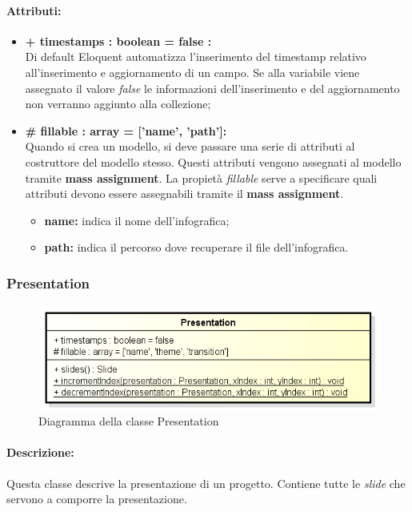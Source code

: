 	\paragraph{Attributi:}
		\begin{itemize}
			\item \textbf{+ timestamps : boolean = false :}\\
			Di default Eloquent automatizza l'inserimento del timestamp relativo all'inserimento e aggiornamento di un campo. Se alla variabile viene assegnato il valore \textit{false} le informazioni dell'inserimento e del aggiornamento non verranno aggiunto alla collezione;
			\item \textbf{\# fillable : array = [’name’, ’path’]:}\\
			Quando si crea un modello, si deve passare una serie di attributi al costruttore del modello stesso. Questi attributi vengono assegnati al modello tramite \textbf{mass assignment}. La propietà \textit{fillable} serve a specificare quali attributi devono essere assegnabili tramite il \textbf{mass assignment}.
			\begin{itemize}
				\item \textbf{name:} indica il nome dell'infografica;
				\item \textbf{path:} indica il percorso dove recuperare il file dell'infografica.
			\end{itemize}
		\end{itemize}
\newpage


\subsubsection{Presentation}

	\begin{figure}[h]
		\centering
		\includegraphics[width=0.8\linewidth]{img/back_end_premi_model_presentation}
		\caption[Diagramma della classe Presentation]{Diagramma della classe Presentation}
		\label{fig:back_end_premi_model_presentation}
	\end{figure}


	\paragraph{Descrizione:}
	Questa classe descrive la presentazione di un progetto. Contiene tutte le \textit{slide} che servono a comporre la presentazione.

